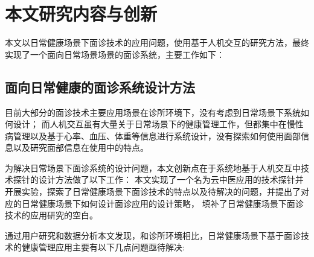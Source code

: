 \section{本文研究内容与创新}

本文以日常健康场景下面诊技术的应用问题，使用基于人机交互的研究方法，最终实现了一个面向日常场景场景的面诊系统，主要工作如下：

\subsection{面向日常健康的面诊系统设计方法}

目前大部分的面诊技术主要应用场景在诊所环境下，没有考虑到日常场景下系统如何设计；
而人机交互虽有大量关于日常场景下的健康管理工作，但都集中在慢性病管理以及基于心率、血压、体重等信息进行系统设计，没有探索如何使用面部信息以及研究面部信息在使用中的特点。

为解决日常场景下面诊系统的设计问题，本文创新点在于系统地基于人机交互中技术探针的设计方法做了以下工作：
本文实现了一个名为云中医应用的技术探针并开展实验，探索了日常健康场景下面诊技术的特点以及待解决的问题，并提出了对应的日常健康场景下如何设计面诊应用的设计策略，
填补了日常健康场景下面诊技术的应用研究的空白\cite{ding2019reading}。

通过用户研究和数据分析本文发现，和诊所环境相比，日常健康场景下基于面诊技术的健康管理应用主要有以下几点问题亟待解决: 

